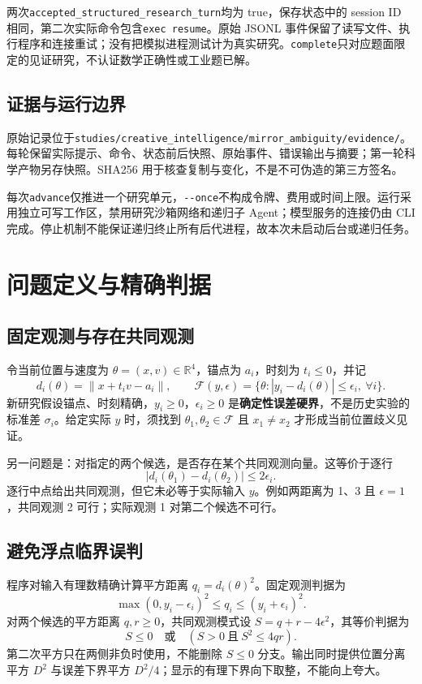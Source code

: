 \documentclass[UTF8,a4paper,zihao=-4,fontset=none]{ctexart}
\newcommand{\code}[1]{{\small\nolinkurl{#1}}}
\begin{document}
两次\code{accepted_structured_research_turn}均为 true，保存状态中的 session ID 相同，第二次实际命令包含\texttt{exec resume}。原始 JSONL 事件保留了读写文件、执行程序和连接重试；没有把模拟进程测试计为真实研究。\code{complete}只对应题面限定的见证研究，不认证数学正确性或工业题已解。

\subsection{证据与运行边界}
原始记录位于\code{studies/creative_intelligence/mirror_ambiguity/evidence/}。每轮保留实际提示、命令、状态前后快照、原始事件、错误输出与摘要；第一轮科学产物另存快照。SHA256 用于核查复制与变化，不是不可伪造的第三方签名。

每次\code{advance}仅推进一个研究单元，\code{--once}不构成令牌、费用或时间上限。运行采用独立可写工作区，禁用研究沙箱网络和递归子 Agent；模型服务的连接仍由 CLI 完成。停止机制不能保证递归终止所有后代进程，故本次未启动后台或递归任务。

\newpage
\section{问题定义与精确判据}
\subsection{固定观测与存在共同观测}
令当前位置与速度为 $\theta=(x,v)\in\mathbb R^4$，锚点为 $a_i$，时刻为 $t_i\le0$，并记
\[
d_i(\theta)=\|x+t_i v-a_i\|,\qquad
\mathcal F(y,\epsilon)=\{\theta:|y_i-d_i(\theta)|\le\epsilon_i,\ \forall i\}.
\]
新研究假设锚点、时刻精确，$y_i\ge0$，$\epsilon_i\ge0$ 是\textbf{确定性误差硬界}，不是历史实验的标准差 $\sigma_i$。给定实际 $y$ 时，须找到 $\theta_1,\theta_2\in\mathcal F$ 且 $x_1\ne x_2$ 才形成当前位置歧义见证。

另一问题是：对指定的两个候选，是否存在某个共同观测向量。这等价于逐行
\[
|d_i(\theta_1)-d_i(\theta_2)|\le2\epsilon_i.
\]
逐行中点给出共同观测，但它未必等于实际输入 $y$。例如两距离为 1、3 且 $\epsilon=1$，共同观测 2 可行；实际观测 1 对第二个候选不可行。

\subsection{避免浮点临界误判}
程序对输入有理数精确计算平方距离 $q_i=d_i(\theta)^2$。固定观测判据为
\[
\max(0,y_i-\epsilon_i)^2\le q_i\le(y_i+\epsilon_i)^2.
\]
对两个候选的平方距离 $q,r\ge0$，共同观测模式设 $S=q+r-4\epsilon^2$，其等价判据为
\[
S\le0\quad\text{或}\quad (S>0\ \text{且}\ S^2\le4qr).
\]
第二次平方只在两侧非负时使用，不能删除 $S\le0$ 分支。输出同时提供位置分离平方 $D^2$ 与误差下界平方 $D^2/4$；显示的有理下界向下取整，不能向上夸大。
\end{document}
